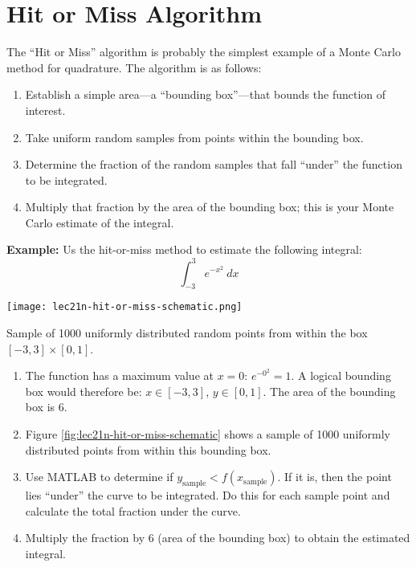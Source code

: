 \section{Hit or Miss Algorithm}
The ``Hit or Miss'' algorithm is probably the simplest example of a Monte Carlo method for quadrature.  The algorithm is as follows:
\begin{enumerate}
\item Establish a simple area---a ``bounding box''---that bounds the function of interest.
\item Take uniform random samples from points within the bounding box.
\item Determine the fraction of the random samples that fall ``under'' the function to be integrated.
\item Multiply that fraction by the area of the bounding box; this is your Monte Carlo estimate of the integral.
\end{enumerate}

\vspace{0.25cm}

\noindent\textbf{Example:} Us the hit-or-miss method to estimate the following integral:
\begin{equation*}
\int_{-3}^{3} e^{-x^2} \ dx
\end{equation*}

\begin{marginfigure}
\texttt{[image: lec21n-hit-or-miss-schematic.png]}
\caption{Sample of 1000 uniformly distributed random points from within the box $[-3,3]\times[0,1]$.}
\label{fig:lec21n-hit-or-miss-schematic}
\end{marginfigure}

\begin{enumerate}
\item The function has a maximum value at $x=0$: $e^{-0^2} = 1$.  A logical bounding box would therefore be: $x \in [-3,3]$, $y \in [0,1]$.  The area of the bounding box is 6.

\item Figure \ref{fig:lec21n-hit-or-miss-schematic} shows a sample of 1000 uniformly distributed points from within this bounding box.

\item Use MATLAB to determine if $y_{\text{sample}} < f(x_{\text{sample}})$.  If it is, then the point lies ``under'' the curve to be integrated.  Do this for each sample point and calculate the total fraction under the curve.

\item Multiply the fraction by 6 (area of the bounding box) to obtain the estimated integral.
\end{enumerate}

